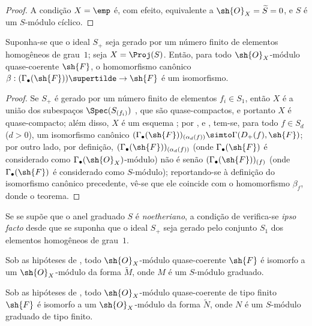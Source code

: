 \documentclass[oneside,10pt]{amsart}
\makeatletter
\newcommand{\ega@arrow}[2]{\mathchoice{#1}{#2}{#2}{#2}}
\renewcommand{\to}{\ega@arrow{\longrightarrow}{\rightarrow}}
\let\EGAOriginalLabel\label
\renewcommand{\label}[1]{\phantomsection\EGAOriginalLabel{#1}}
\makeatother
\begin{document}
\begin{proof}
A condição $X=\emp$ é, com efeito, equivalente a $\sh{O}_X=\widetilde{S}=0$, e $S$ é um $S$-módulo cíclico.
\end{proof}

\begin{theorem}[2.7.5]
\label{II.2.7.5}
Suponha-se que o ideal $S_+$ seja gerado por um número finito de elementos homogêneos de grau~$1$;
seja $X=\Proj(S)$.
Então, para todo $\sh{O}_X$-módulo quase-coerente $\sh{F}$, o homomorfismo canônico $\beta:(\Gamma_\bullet(\sh{F}))\supertilde\to\sh{F}$  é um isomorfismo.
\end{theorem}

\begin{proof}
Se $S_+$ é gerado por um número finito de elementos $f_i\in S_1$, então $X$ é a união dos subespaços $\Spec(S_{(f_i)})$ , que são quase-compactos, e portanto $X$ é quase-compacto;
além disso, $X$ é um esquema ;
por ,  e , tem-se, para todo $f\in S_d$ ($d>0$), um isomorfismo canônico $(\Gamma_\bullet(\sh{F}))_{(\alpha_d(f))}\simto\Gamma(D_+(f),\sh{F})$;
por outro lado, por definição, $(\Gamma_\bullet(\sh{F}))_{(\alpha_d(f))}$ (onde $\Gamma_\bullet(\sh{F})$ é considerado como $\Gamma_\bullet(\sh{O}_X)$-módulo) não é senão $(\Gamma_\bullet(\sh{F}))_{(f)}$ (onde $\Gamma_\bullet(\sh{F})$ é considerado como $S$-módulo);
reportando-se à definição  do isomorfismo canônico precedente, vê-se que ele coincide com o homomorfismo $\beta_f$, donde o teorema.
\end{proof}

\begin{remark}[2.7.6]
\label{II.2.7.6}
Se se supõe que o anel graduado $S$ é \emph{noetheriano}, a condição de  verifica-se \emph{ipso facto} desde que se suponha que o ideal $S_+$ seja gerado pelo conjunto $S_1$ dos elementos homogêneos de grau~$1$.
\end{remark}

\begin{corollary}[2.7.7]
\label{II.2.7.7}
Sob as hipóteses de , todo $\sh{O}_X$-módulo quase-coerente $\sh{F}$ é isomorfo a um $\sh{O}_X$-módulo da forma $\widetilde{M}$, onde $M$ é um $S$-módulo graduado.
\end{corollary}

\begin{corollary}[2.7.8]
\label{II.2.7.8}
Sob as hipóteses de , todo $\sh{O}_X$-módulo quase-coerente de tipo finito $\sh{F}$ é isomorfo a um $\sh{O}_X$-módulo da forma $\widetilde{N}$, onde $N$ é um $S$-módulo graduado de tipo finito.
\end{corollary}
\end{document}
